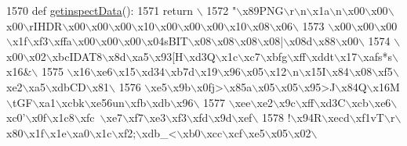 \begin{DoxyCode}
1570 \textcolor{keyword}{def }\hyperlink{namespaceimages_aa0295fd7df9df8a8c36dbf45957ebe34}{getinspectData}():
1571     \textcolor{keywordflow}{return} \(\backslash\)
1572 \textcolor{stringliteral}{"\(\backslash\)x89PNG\(\backslash\)r\(\backslash\)n\(\backslash\)x1a\(\backslash\)n\(\backslash\)x00\(\backslash\)x00\(\backslash\)x00\(\backslash\)rIHDR\(\backslash\)x00\(\backslash\)x00\(\backslash\)x00\(\backslash\)x10\(\backslash\)x00\(\backslash\)x00\(\backslash\)x00\(\backslash\)x10\(\backslash\)x08\(\backslash\)x06\(\backslash\)}
1573 \textcolor{stringliteral}{\(\backslash\)x00\(\backslash\)x00\(\backslash\)x00\(\backslash\)x1f\(\backslash\)xf3\(\backslash\)xffa\(\backslash\)x00\(\backslash\)x00\(\backslash\)x00\(\backslash\)x04sBIT\(\backslash\)x08\(\backslash\)x08\(\backslash\)x08\(\backslash\)x08|\(\backslash\)x08d\(\backslash\)x88\(\backslash\)x00\(\backslash\)}
1574 \textcolor{stringliteral}{\(\backslash\)x00\(\backslash\)x02\(\backslash\)xbcIDAT8\(\backslash\)x8d\(\backslash\)xa5\(\backslash\)x93[H\(\backslash\)xd3Q\(\backslash\)x1c\(\backslash\)xc7\(\backslash\)xbfg\(\backslash\)xff\(\backslash\)xddt\(\backslash\)x17\(\backslash\)xafs*s\(\backslash\)x16&\(\backslash\)}
1575 \textcolor{stringliteral}{\(\backslash\)x16\(\backslash\)xe6\(\backslash\)x15\(\backslash\)xd34\(\backslash\)xb7d\(\backslash\)x19\(\backslash\)x96\(\backslash\)x05\(\backslash\)x12\(\backslash\)n\(\backslash\)x15I\(\backslash\)x84\(\backslash\)x08\(\backslash\)xf5\(\backslash\)xe2\(\backslash\)xa5\(\backslash\)xdbCD\(\backslash\)x81\(\backslash\)}
1576 \textcolor{stringliteral}{\(\backslash\)xe5\(\backslash\)x9b\(\backslash\)x0fj>\(\backslash\)x85a\(\backslash\)x05\(\backslash\)x05\(\backslash\)x95>J\(\backslash\)x84Q\(\backslash\)x16M\(\backslash\)tGF\(\backslash\)xa1\(\backslash\)xcbk\(\backslash\)xe56un\(\backslash\)xfb\(\backslash\)xdb\(\backslash\)x96\(\backslash\)}
1577 \textcolor{stringliteral}{\(\backslash\)xee\(\backslash\)xe2\(\backslash\)x9c\(\backslash\)xff\(\backslash\)xd3C\(\backslash\)xcb\(\backslash\)xe6\(\backslash\)xc0'\(\backslash\)x0f\(\backslash\)x1c8\(\backslash\)xfc~\(\backslash\)xe7\(\backslash\)xf7\(\backslash\)xe3\(\backslash\)xf3\(\backslash\)xfd\(\backslash\)x9d\(\backslash\)xef\(\backslash\)}
1578 \textcolor{stringliteral}{!\(\backslash\)x94R\(\backslash\)xecd\(\backslash\)xf1vT\(\backslash\)r\(\backslash\)x80\(\backslash\)x1f\(\backslash\)x1e\(\backslash\)xa0\(\backslash\)x1c\(\backslash\)xf2;\(\backslash\)xdb\_<\(\backslash\)xb0\(\backslash\)xcc\(\backslash\)xcf\(\backslash\)xe5\(\backslash\)x05\(\backslash\)x02\(\backslash\)}

\end{DoxyCode}
